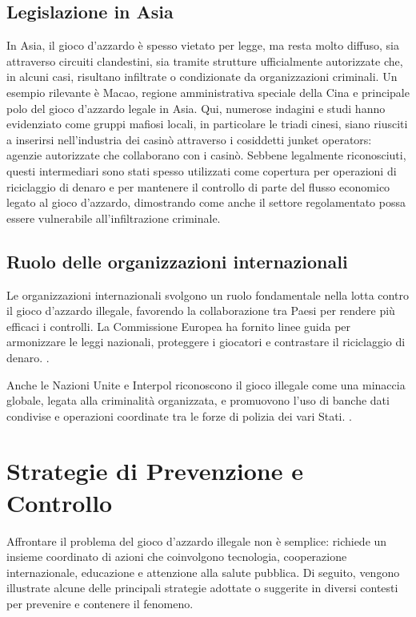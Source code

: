 \documentclass[a4paper,12pt]{article}
\begin{document}
\subsection{Legislazione in Asia}

In Asia, il gioco d’azzardo è spesso vietato per legge, ma resta molto diffuso, sia attraverso circuiti clandestini, sia tramite strutture ufficialmente autorizzate che, in alcuni casi, risultano infiltrate o condizionate da organizzazioni criminali. Un esempio rilevante è Macao, regione amministrativa speciale della Cina e principale polo del gioco d’azzardo legale in Asia. Qui, numerose indagini e studi hanno evidenziato come gruppi mafiosi locali, in particolare le triadi cinesi, siano riusciti a inserirsi nell’industria dei casinò attraverso i cosiddetti junket operators: agenzie autorizzate che collaborano con i casinò. Sebbene legalmente riconosciuti, questi intermediari sono stati spesso utilizzati come copertura per operazioni di riciclaggio di denaro e per mantenere il controllo di parte del flusso economico legato al gioco d’azzardo, dimostrando come anche il settore regolamentato possa essere vulnerabile all’infiltrazione criminale.

\subsection{Ruolo delle organizzazioni internazionali}

Le organizzazioni internazionali svolgono un ruolo fondamentale nella lotta contro il gioco d’azzardo illegale, favorendo la collaborazione tra Paesi per rendere più efficaci i controlli. La Commissione Europea ha fornito linee guida per armonizzare le leggi nazionali, proteggere i giocatori e contrastare il riciclaggio di denaro. \cite{lucchini2022socialcosts}.

Anche le Nazioni Unite e Interpol riconoscono il gioco illegale come una minaccia globale, legata alla criminalità organizzata, e promuovono l’uso di banche dati condivise e operazioni coordinate tra le forze di polizia dei vari Stati. \cite{banks2018taxonomy}.


\section{Strategie di Prevenzione e Controllo}

Affrontare il problema del gioco d’azzardo illegale non è semplice: richiede un insieme coordinato di azioni che coinvolgono tecnologia, cooperazione internazionale, educazione e attenzione alla salute pubblica. Di seguito, vengono illustrate alcune delle principali strategie adottate o suggerite in diversi contesti per prevenire e contenere il fenomeno.
\end{document}
